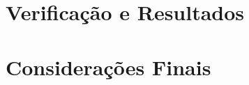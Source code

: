\documentclass[
	12pt,				%
	openright,			%
	oneside,			%
	a4paper,			%
	english,			%
	french,				%
	spanish,			%
	brazil,				%
	]{abntex2}
\begin{document}
\chapter{Verificação e Resultados}
\label{cap-resultados}


\chapter{Considerações Finais}
\label{cap-consideracoes}



% 

% 

% 

% 

% 




% 

\postextual








%
%


\end{document}
